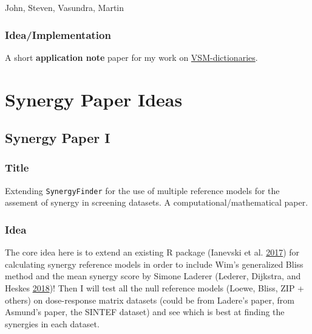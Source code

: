 \documentclass[
  12pt,
]{book}
\begin{document}
John, Steven, Vasundra, Martin

\hypertarget{ideaimplementation}{%
\subsubsection*{Idea/Implementation}\label{ideaimplementation}}

A short \textbf{application note} paper for my work on \protect\hyperlink{vsm-dict}{VSM-dictionaries}.

\hypertarget{synergy-paper-ideas}{%
\section{Synergy Paper Ideas}\label{synergy-paper-ideas}}

\hypertarget{synergy-paper-i}{%
\subsection*{Synergy Paper I}\label{synergy-paper-i}}

\hypertarget{title}{%
\subsubsection*{Title}\label{title}}

Extending \texttt{SynergyFinder} for the use of multiple reference models for the assement of synergy in screening datasets.
A computational/mathematical paper.

\hypertarget{idea-1}{%
\subsubsection*{Idea}\label{idea-1}}

The core idea here is to extend an existing R package (Ianevski et al. \protect\hyperlink{ref-Ianevski2017}{2017}) for calculating synergy reference models in order to include Wim's generalized Bliss method and the mean synergy score by Simone Laderer (Lederer, Dijkstra, and Heskes \protect\hyperlink{ref-Lederer2018}{2018})!
Then I will test all the null reference models (Loewe, Bliss, ZIP + others) on dose-response matrix datasets (could be from Ladere's paper, from Asmund's paper, the SINTEF dataset) and see which is best at finding the synergies in each dataset.
\end{document}
